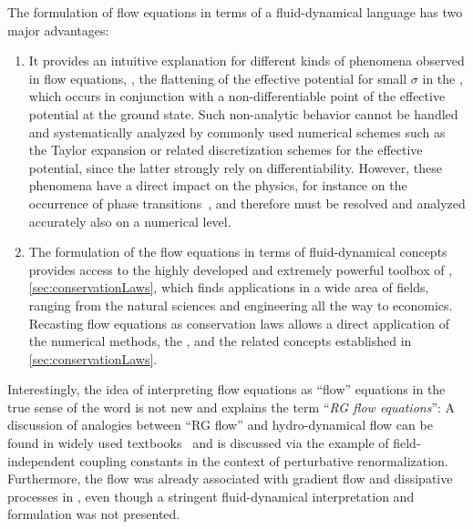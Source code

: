 The formulation of \frg{} flow equations in terms of a fluid-dynamical language has two  major advantages:
\begin{enumerate}
	\item It provides an intuitive explanation for different kinds of phenomena observed in \frg{} flow equations, \eg{}, the flattening of the effective potential for small $\sigma$ in the \ir{}, which occurs in conjunction with a non-differentiable point of the effective potential at the ground state.
	Such non-analytic behavior cannot be handled and systematically analyzed by commonly used numerical schemes such as the Taylor expansion or related discretization schemes for the effective potential, since the latter strongly rely on differentiability.
	However, these phenomena have a direct impact on the physics, for instance on the occurrence of phase transitions~\cite{Aoki:2017rjl,Bonanno:2004pq,Pangon:2009pj,Pangon:2010uf,Grossi:2019urj,Wipf:2013vp,Ehrenfest1933,Grossi:2021ksl}, and therefore must be resolved and analyzed accurately also on a numerical level.
	
	\item The formulation of the \frg{} flow equations in terms of fluid-dynamical concepts provides access to the highly developed and extremely powerful toolbox of \cfd{}, \cf{} \cref{sec:conservationLaws}, which finds applications in a wide area of fields, ranging from the natural sciences and engineering all the way to economics.
	Recasting \frg{} flow equations as conservation laws allows a direct application of the numerical methods, \viz{} the \ktScheme{}, and the related \cfd{} concepts established in \cref{sec:conservationLaws}.
\end{enumerate}	
Interestingly, the idea of interpreting \rg{} flow equations as ``flow'' equations in the true sense of the word is not new and explains the term ``\textit{RG flow equations}'': A discussion of analogies between ``RG flow'' and hydro-dynamical flow can be found in widely used textbooks~\cite{Peskin:1995ev,Coleman:1985rnk} and is discussed via the example of field-independent coupling constants in the context of perturbative renormalization.
Furthermore, the \rg{} flow was already associated with gradient flow and dissipative processes in , even though a stringent fluid-dynamical interpretation and formulation was not presented. 

